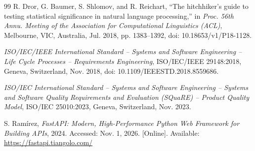 \begin{thebibliography}{99}
R. Dror, G. Baumer, S. Shlomov, and R. Reichart, ``The hitchhiker's guide to testing statistical significance in natural language processing,'' in \textit{Proc. 56th Annu. Meeting of the Association for Computational Linguistics (ACL)}, Melbourne, VIC, Australia, Jul. 2018, pp. 1383--1392, doi: 10.18653/v1/P18-1128.

\textit{ISO/IEC/IEEE International Standard -- Systems and Software Engineering -- Life Cycle Processes -- Requirements Engineering}, ISO/IEC/IEEE 29148:2018, Geneva, Switzerland, Nov. 2018, doi: 10.1109/IEEESTD.2018.8559686.

\textit{ISO/IEC International Standard -- Systems and Software Engineering -- Systems and Software Quality Requirements and Evaluation (SQuaRE) -- Product Quality Model}, ISO/IEC 25010:2023, Geneva, Switzerland, Nov. 2023.

S. Ram\'irez, \textit{FastAPI: Modern, High-Performance Python Web Framework for Building APIs}, 2024. Accessed: Nov. 1, 2026. [Online]. Available: \url{https://fastapi.tiangolo.com/}

\end{thebibliography}
